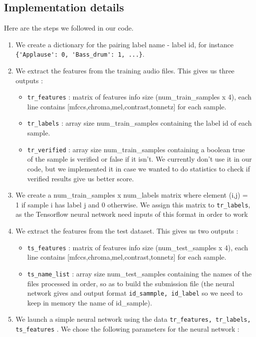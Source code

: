 \documentclass{article} %
\begin{document}
		\subsection{Implementation details}
			Here are the steps we followed in our code.

			\begin{enumerate}
				\item We create a dictionary for the pairing label name - label id, for instance \verb+{'Applause': 0, 'Bass_drum': 1, ...}+.
				\item We extract the features from the training audio files. This gives us three outputs :
					\begin{itemize}
						\item \verb+tr_features+ : matrix of features info size (num\_train\_samples x 4), each line contains [mfccs,chroma,mel,contrast,tonnetz] for each sample.
						\item \verb+tr_labels+ : array size num\_train\_samples containing the label id of each sample.
						\item \verb+tr_verified+ : array size num\_train\_samples containing a boolean true of the sample is verified or false if it isn't. We currently don't use it in our code, but we implemented it in case we wanted to do statistics to check if verified results give us better score.
					\end{itemize}
				\item We create a num\_train\_samples x num\_labels matrix where element (i,j) = 1 if sample i has label j and 0 otherwise. We assign this matrix to \verb+tr_labels+, as the Tensorflow neural network need inputs of this format in order to work
				\item We extract the features from the test dataset. This gives us two outputs :
					\begin{itemize}
						\item \verb+ts_features+ : matrix of features info size (num\_test\_samples x 4), each line contains [mfccs,chroma,mel,contrast,tonnetz] for each sample.
						\item \verb+ts_name_list+ : array size num\_test\_samples containing the names of the files processed in order, so as to build the submission file (the neural network gives and output format \verb+id_sammple, id_label+ so we need to keep in memory the name of id\_sample).
					\end{itemize}
				\item We launch a simple neural network using the data \verb+tr_features, tr_labels, ts_features+ . We chose the following parameters for the neural network :

\end{enumerate}
\end{document}
